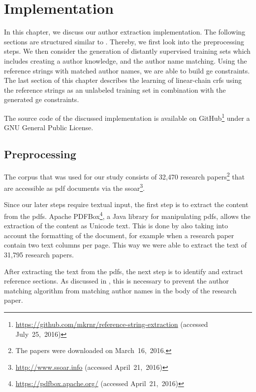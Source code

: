 \chapter{Implementation}\label{cha:implementation}

In this chapter, we discuss our author extraction implementation.
The following sections are structured similar to .
Thereby, we first look into the preprocessing steps.
We then consider the generation of distantly supervised training sets which includes creating a author knowledge, and the author name matching.
Using the reference strings with matched author names, we are able to build \gls{ge} constraints.
The last section of this chapter describes the learning of \glspl{linear-chain crf} using the reference strings as an unlabeled training set in combination with the generated \gls{ge} constraints.

The source code of the discussed implementation is available on GitHub\footnote{\url{https://github.com/mkrnr/reference-string-extraction} (accessed July~25,~2016)} under a GNU General Public License.

\section{Preprocessing}\label{sec:i-preprocessing}

The corpus that was used for our study consists of 32,470 research papers\footnote{The papers were downloaded on March~16,~2016.} that are accessible as \gls{pdf} documents via the \gls{ssoar}\footnote{\url{http://www.ssoar.info} (accessed April~21,~2016)}.

Since our later steps require textual input, the first step is to extract the content from the \glspl{pdf}.
Apache PDFBox\footnote{\url{https://pdfbox.apache.org/} (accessed April~21,~2016)}, a Java library for manipulating \glspl{pdf}, allows the extraction of the content as Unicode text.
This is done by also taking into account the formatting of the document, for example when a research paper contain two text columns per page.
This way we were able to extract the text of 31,795 research papers.

\bigskip

After extracting the text from the \glspl{pdf}, the next step is to identify and extract reference sections.
As discussed in , this is necessary to prevent the author matching algorithm from matching author names in the body of the research paper.

